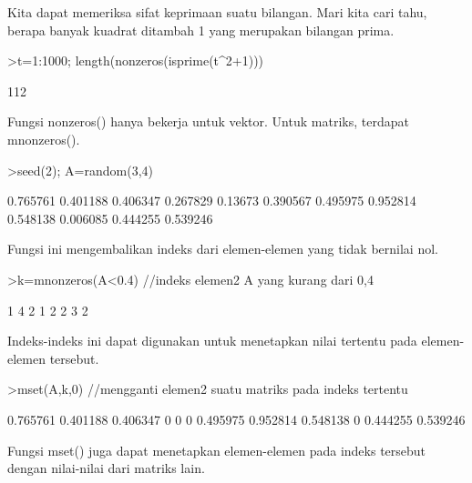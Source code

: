 \documentclass{article}
\newenvironment{eulernotebook}{\par}{\par}
\newenvironment{eulercomment}{\par\medskip}{\par\medskip}
\begin{document}
\begin{eulernotebook}
\begin{eulercomment}
\begin{eulercomment}
\begin{eulercomment}
\begin{eulercomment}
\begin{eulercomment}
Kita dapat memeriksa sifat keprimaan suatu bilangan. Mari kita cari
tahu, berapa banyak kuadrat ditambah 1 yang merupakan bilangan prima.
\end{eulercomment}
\begin{eulerprompt}
>t=1:1000; length(nonzeros(isprime(t^2+1)))
\end{eulerprompt}
\begin{euleroutput}
  112
\end{euleroutput}
\begin{eulercomment}
Fungsi nonzeros() hanya bekerja untuk vektor. Untuk matriks, terdapat
mnonzeros().
\end{eulercomment}
\begin{eulerprompt}
>seed(2); A=random(3,4)
\end{eulerprompt}
\begin{euleroutput}
       0.765761      0.401188      0.406347      0.267829 
        0.13673      0.390567      0.495975      0.952814 
       0.548138      0.006085      0.444255      0.539246 
\end{euleroutput}
\begin{eulercomment}
Fungsi ini mengembalikan indeks dari elemen-elemen yang tidak bernilai
nol.
\end{eulercomment}
\begin{eulerprompt}
>k=mnonzeros(A<0.4) //indeks elemen2 A yang kurang dari 0,4
\end{eulerprompt}
\begin{euleroutput}
              1             4 
              2             1 
              2             2 
              3             2 
\end{euleroutput}
\begin{eulercomment}
Indeks-indeks ini dapat digunakan untuk menetapkan nilai tertentu pada
elemen-elemen tersebut.
\end{eulercomment}
\begin{eulerprompt}
>mset(A,k,0) //mengganti elemen2 suatu matriks pada indeks tertentu
\end{eulerprompt}
\begin{euleroutput}
       0.765761      0.401188      0.406347             0 
              0             0      0.495975      0.952814 
       0.548138             0      0.444255      0.539246 
\end{euleroutput}
\begin{eulercomment}
Fungsi mset() juga dapat menetapkan elemen-elemen pada indeks tersebut
dengan nilai-nilai dari matriks lain.

\end{eulercomment}
\end{eulercomment}
\end{eulercomment}
\end{eulercomment}
\end{eulercomment}
\end{eulernotebook}
\end{document}
